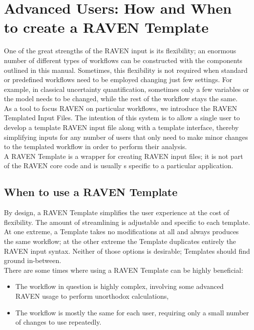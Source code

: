 \section{Advanced Users: How and When to create a RAVEN Template}
\label{sec:newTemplate}

One of the great strengths of the RAVEN input is its flexibility; an enormous number of different types of workflows can
%
be constructed with the components outlined in this manual. Sometimes, this flexibility is not required when standard or
%
predefined workflows need to be employed changing just few settings. For example, in classical uncertainty
%
quantification, sometimes only a few variables or the model needs to be changed, while the rest of the workflow stays
%
the same.
\\

As a tool to focus RAVEN on particular workflows, we introduce the RAVEN Templated Input Files. The intention of this
%
system is to allow a single user to develop a template RAVEN input file along with a template interface, thereby
%
simplifying inputs for any number of users that only need to make minor changes to the templated workflow in order to
%
perform their analysis.
\\

\nb A RAVEN Template is a wrapper for creating RAVEN input files; it is not part of the RAVEN core code and is usually s
%
specific to a particular application.

\subsection{When to use a RAVEN Template}
%
By design, a RAVEN Template simplifies the user experience at the cost of flexibility. The amount of streamlining is
%
adjustable and specific to each template. At one extreme, a Template takes no modifications at all and always produces
%
the same workflow; at the other extreme the Template duplicates entirely the RAVEN input syntax. Neither of those
%
options is desirable; Templates should find ground in-between.
\\

There are some times where using a RAVEN Template can be highly beneficial:
%
\begin{itemize}
  \item The workflow in question is highly complex, involving some advanced RAVEN usage to perform unorthodox calculations,
  \item The workflow is mostly the same for each user, requiring only a small number of changes to use repeatedly.
\end{itemize}

